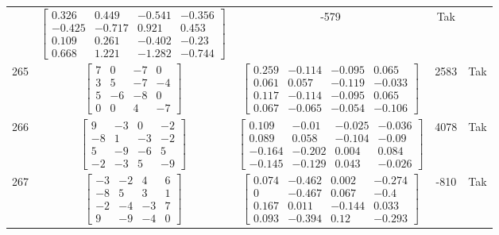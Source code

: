 \documentclass[a4paper,12pt]{article}
\begin{document}
\begin{tabular}{c c c c c}
&
$\begin{bmatrix} 0.326 & 0.449 & -0.541 & -0.356 \\ -0.425 & -0.717 & 0.921 & 0.453 \\ 0.109 & 0.261 & -0.402 & -0.23 \\ 0.668 & 1.221 & -1.282 & -0.744 \end{bmatrix}$
&
-579
&
Tak
\\
265
&
$\begin{bmatrix} 7 & 0 & -7 & 0 \\ 3 & 5 & -7 & -4 \\ 5 & -6 & -8 & 0 \\ 0 & 0 & 4 & -7 \end{bmatrix}$
&
$\begin{bmatrix} 0.259 & -0.114 & -0.095 & 0.065 \\ 0.061 & 0.057 & -0.119 & -0.033 \\ 0.117 & -0.114 & -0.095 & 0.065 \\ 0.067 & -0.065 & -0.054 & -0.106 \end{bmatrix}$
&
2583
&
Tak
\\
266
&
$\begin{bmatrix} 9 & -3 & 0 & -2 \\ -8 & 1 & -3 & -2 \\ 5 & -9 & -6 & 5 \\ -2 & -3 & 5 & -9 \end{bmatrix}$
&
$\begin{bmatrix} 0.109 & -0.01 & -0.025 & -0.036 \\ 0.089 & 0.058 & -0.104 & -0.09 \\ -0.164 & -0.202 & 0.004 & 0.084 \\ -0.145 & -0.129 & 0.043 & -0.026 \end{bmatrix}$
&
4078
&
Tak
\\
267
&
$\begin{bmatrix} -3 & -2 & 4 & 6 \\ -8 & 5 & 3 & 1 \\ -2 & -4 & -3 & 7 \\ 9 & -9 & -4 & 0 \end{bmatrix}$
&
$\begin{bmatrix} 0.074 & -0.462 & 0.002 & -0.274 \\ 0 & -0.467 & 0.067 & -0.4 \\ 0.167 & 0.011 & -0.144 & 0.033 \\ 0.093 & -0.394 & 0.12 & -0.293 \end{bmatrix}$
&
-810
&
Tak
\\

\end{tabular}
\end{document}
